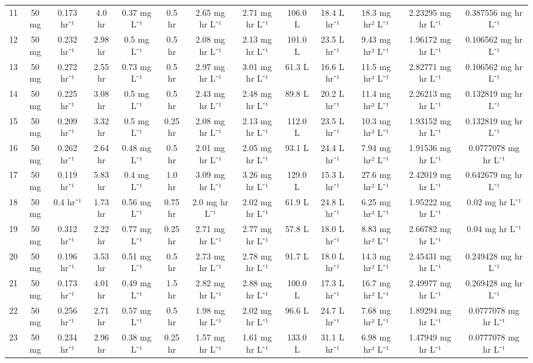 \documentclass[12pt,a4paper]{article}
\begin{document}
\begin{tabular}{r|cccccccccccc}
	11 & 50 mg & 0.173 hr⁻¹ & 4.0 hr & 0.37 mg L⁻¹ & 0.5 hr & 2.65 mg hr L⁻¹ & 2.71 mg hr L⁻¹ & 106.0 L & 18.4 L hr⁻¹ & 18.3 mg hr² L⁻¹ & 2.23295 mg hr L⁻¹ & 0.387556 mg hr L⁻¹ \\
	12 & 50 mg & 0.232 hr⁻¹ & 2.98 hr & 0.5 mg L⁻¹ & 0.5 hr & 2.08 mg hr L⁻¹ & 2.13 mg hr L⁻¹ & 101.0 L & 23.5 L hr⁻¹ & 9.43 mg hr² L⁻¹ & 1.96172 mg hr L⁻¹ & 0.106562 mg hr L⁻¹ \\
	13 & 50 mg & 0.272 hr⁻¹ & 2.55 hr & 0.73 mg L⁻¹ & 0.5 hr & 2.97 mg hr L⁻¹ & 3.01 mg hr L⁻¹ & 61.3 L & 16.6 L hr⁻¹ & 11.5 mg hr² L⁻¹ & 2.82771 mg hr L⁻¹ & 0.106562 mg hr L⁻¹ \\
	14 & 50 mg & 0.225 hr⁻¹ & 3.08 hr & 0.5 mg L⁻¹ & 0.5 hr & 2.43 mg hr L⁻¹ & 2.48 mg hr L⁻¹ & 89.8 L & 20.2 L hr⁻¹ & 11.4 mg hr² L⁻¹ & 2.26213 mg hr L⁻¹ & 0.132819 mg hr L⁻¹ \\
	15 & 50 mg & 0.209 hr⁻¹ & 3.32 hr & 0.5 mg L⁻¹ & 0.25 hr & 2.08 mg hr L⁻¹ & 2.13 mg hr L⁻¹ & 112.0 L & 23.5 L hr⁻¹ & 10.3 mg hr² L⁻¹ & 1.93152 mg hr L⁻¹ & 0.132819 mg hr L⁻¹ \\
	16 & 50 mg & 0.262 hr⁻¹ & 2.64 hr & 0.48 mg L⁻¹ & 0.5 hr & 2.01 mg hr L⁻¹ & 2.05 mg hr L⁻¹ & 93.1 L & 24.4 L hr⁻¹ & 7.94 mg hr² L⁻¹ & 1.91536 mg hr L⁻¹ & 0.0777078 mg hr L⁻¹ \\
	17 & 50 mg & 0.119 hr⁻¹ & 5.83 hr & 0.4 mg L⁻¹ & 1.0 hr & 3.09 mg hr L⁻¹ & 3.26 mg hr L⁻¹ & 129.0 L & 15.3 L hr⁻¹ & 27.6 mg hr² L⁻¹ & 2.42019 mg hr L⁻¹ & 0.642679 mg hr L⁻¹ \\
	18 & 50 mg & 0.4 hr⁻¹ & 1.73 hr & 0.56 mg L⁻¹ & 0.75 hr & 2.0 mg hr L⁻¹ & 2.02 mg hr L⁻¹ & 61.9 L & 24.8 L hr⁻¹ & 6.25 mg hr² L⁻¹ & 1.95222 mg hr L⁻¹ & 0.02 mg hr L⁻¹ \\
	19 & 50 mg & 0.312 hr⁻¹ & 2.22 hr & 0.77 mg L⁻¹ & 0.25 hr & 2.71 mg hr L⁻¹ & 2.77 mg hr L⁻¹ & 57.8 L & 18.0 L hr⁻¹ & 8.83 mg hr² L⁻¹ & 2.66782 mg hr L⁻¹ & 0.04 mg hr L⁻¹ \\
	20 & 50 mg & 0.196 hr⁻¹ & 3.53 hr & 0.51 mg L⁻¹ & 0.5 hr & 2.73 mg hr L⁻¹ & 2.78 mg hr L⁻¹ & 91.7 L & 18.0 L hr⁻¹ & 14.3 mg hr² L⁻¹ & 2.45431 mg hr L⁻¹ & 0.249428 mg hr L⁻¹ \\
	21 & 50 mg & 0.173 hr⁻¹ & 4.01 hr & 0.49 mg L⁻¹ & 1.5 hr & 2.82 mg hr L⁻¹ & 2.88 mg hr L⁻¹ & 100.0 L & 17.3 L hr⁻¹ & 16.7 mg hr² L⁻¹ & 2.49977 mg hr L⁻¹ & 0.269428 mg hr L⁻¹ \\
	22 & 50 mg & 0.256 hr⁻¹ & 2.71 hr & 0.57 mg L⁻¹ & 0.5 hr & 1.98 mg hr L⁻¹ & 2.02 mg hr L⁻¹ & 96.6 L & 24.7 L hr⁻¹ & 7.68 mg hr² L⁻¹ & 1.89294 mg hr L⁻¹ & 0.0777078 mg hr L⁻¹ \\
	23 & 50 mg & 0.234 hr⁻¹ & 2.96 hr & 0.38 mg L⁻¹ & 0.25 hr & 1.57 mg hr L⁻¹ & 1.61 mg hr L⁻¹ & 133.0 L & 31.1 L hr⁻¹ & 6.98 mg hr² L⁻¹ & 1.47949 mg hr L⁻¹ & 0.0777078 mg hr L⁻¹ \\

\end{tabular}
\end{document}
